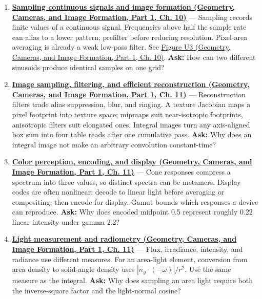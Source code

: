 \begin{enumerate}
\item
  \textbf{\href{../03-Geometry-Cameras-and-Image-Formation-P01/main.pdf\#nameddest=03-visual-computing-i-ch003-sampling-continuous-signals-and-image-formation}{Sampling continuous signals and image formation (Geometry, Cameras, and Image Formation, Part 1, Ch. 10)}} --- Sampling records finite values of a continuous signal. Frequencies above half the sample rate can alias to a lower pattern; prefilter before reducing resolution. Pixel-area averaging is already a weak low-pass filter. See \href{../03-Geometry-Cameras-and-Image-Formation-P01/main.pdf\#nameddest=03-visual-computing-i-ch003-figure-u3---two-signals-can-share-the-same-samples}{Figure U3 (Geometry, Cameras, and Image Formation, Part 1, Ch. 10)}. \textbf{Ask:} How can two different sinusoids produce identical samples on one grid?
\item
  \textbf{\href{../03-Geometry-Cameras-and-Image-Formation-P01/main.pdf\#nameddest=03-visual-computing-i-ch004-image-sampling-filtering-and-efficient-reconstruction}{Image sampling, filtering, and efficient reconstruction (Geometry, Cameras, and Image Formation, Part 1, Ch. 11)}} --- Reconstruction filters trade alias suppression, blur, and ringing. A texture Jacobian maps a pixel footprint into texture space; mipmaps suit near-isotropic footprints, anisotropic filters suit elongated ones. Integral images turn any axis-aligned box sum into four table reads after one cumulative pass. \textbf{Ask:} Why does an integral image not make an arbitrary convolution constant-time?
\item
  \textbf{\href{../03-Geometry-Cameras-and-Image-Formation-P01/main.pdf\#nameddest=03-visual-computing-i-ch004-color-perception-encoding-and-display}{Color perception, encoding, and display (Geometry, Cameras, and Image Formation, Part 1, Ch. 11)}} --- Cone responses compress a spectrum into three values, so distinct spectra can be metamers. Display codes are often nonlinear: decode to linear light before averaging or compositing, then encode for display. Gamut bounds which responses a device can reproduce. \textbf{Ask:} Why does encoded midpoint 0.5 represent roughly 0.22 linear intensity under gamma 2.2?
\item
  \textbf{\href{../03-Geometry-Cameras-and-Image-Formation-P01/main.pdf\#nameddest=03-visual-computing-i-ch004-light-measurement-and-radiometry}{Light measurement and radiometry (Geometry, Cameras, and Image Formation, Part 1, Ch. 11)}} --- Flux, irradiance, intensity, and radiance use different measures. For an area-light element, conversion from area density to solid-angle density uses \(|n_y\cdot(-\omega)|/r^2\). Use the same measure as the integral. \textbf{Ask:} Why does sampling an area light require both the inverse-square factor and the light-normal cosine?

\end{enumerate}
